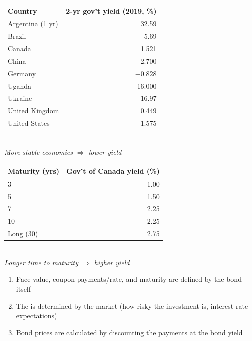 \begin{center}
    \begin{minipage}{0.48\linewidth}\centering
        \begin{tabular}{lr}
            \toprule
            Country & 2-yr gov't yield (2019, \%) \\
            \midrule
            Argentina (1 yr) & 32.59 \\
            Brazil & 5.69 \\
            Canada & 1.521 \\
            China & 2.700 \\
            Germany & $-0.828$ \\
            Uganda & 16.000 \\
            Ukraine & 16.97 \\
            United Kingdom & 0.449 \\
            United States & 1.575 \\
            \bottomrule
        \end{tabular}
        \\[2pt] \textit{\small More stable economies $\Rightarrow$ lower yield}
    \end{minipage}
    \hfill
    \begin{minipage}{0.45\linewidth}\centering
        \begin{tabular}{lr}
            \toprule
            Maturity (yrs) & Gov't of Canada yield (\%) \\
            \midrule
            3 & 1.00 \\
            5 & 1.50 \\
            7 & 2.25 \\
            10 & 2.25 \\
            Long (30) & 2.75 \\
            \bottomrule
        \end{tabular}
        \\[2pt] \textit{\small Longer time to maturity $\Rightarrow$ higher yield}
    \end{minipage}
\end{center}

\begin{enumerate}
    \item \b{Face value, coupon payments/rate, and maturity} are defined by the bond itself
    \item The  is determined by the market (how risky the investment is, interest rate expectations)
    \item Bond prices are calculated by discounting the payments at the bond yield
\end{enumerate}

